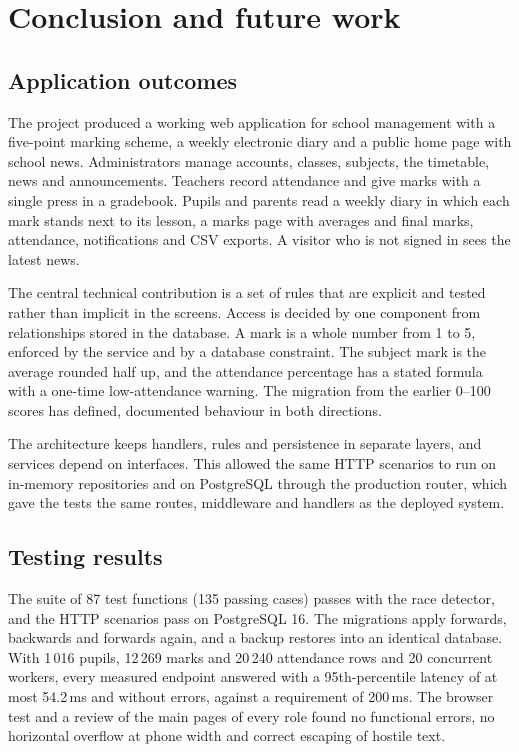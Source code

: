 \chapter{Conclusion and future work}

\section{Application outcomes}

The project produced a working web application for school management with a five-point marking scheme, a weekly electronic diary and a public home page with school news. Administrators manage accounts, classes, subjects, the timetable, news and announcements. Teachers record attendance and give marks with a single press in a gradebook. Pupils and parents read a weekly diary in which each mark stands next to its lesson, a marks page with averages and final marks, attendance, notifications and CSV exports. A visitor who is not signed in sees the latest news.

The central technical contribution is a set of rules that are explicit and tested rather than implicit in the screens. Access is decided by one component from relationships stored in the database. A mark is a whole number from 1 to 5, enforced by the service and by a database constraint. The subject mark is the average rounded half up, and the attendance percentage has a stated formula with a one-time low-attendance warning. The migration from the earlier 0--100 scores has defined, documented behaviour in both directions.

The architecture keeps handlers, rules and persistence in separate layers, and services depend on interfaces. This allowed the same HTTP scenarios to run on in-memory repositories and on PostgreSQL through the production router, which gave the tests the same routes, middleware and handlers as the deployed system.

\section{Testing results}

The suite of 87 test functions (135 passing cases) passes with the race detector, and the HTTP scenarios pass on PostgreSQL 16. The migrations apply forwards, backwards and forwards again, and a backup restores into an identical database. With 1\,016 pupils, 12\,269 marks and 20\,240 attendance rows and 20 concurrent workers, every measured endpoint answered with a 95th-percentile latency of at most 54.2\,ms and without errors, against a requirement of 200\,ms. The browser test and a review of the main pages of every role found no functional errors, no horizontal overflow at phone width and correct escaping of hostile text.

